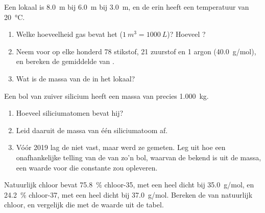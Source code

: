 \begin{exercise}[$\star\star\star$]\label{exo:g10:the-mole:13}
Een lokaal is \qty{8.0}{m} bij \qty{6.0}{m} bij \qty{3.0}{m}, en de
 erin heeft een temperatuur van \qty{20}{\celsius}.
\begin{enumerate}
  \item Welke hoeveelheid gas bevat het ($\qty{1}{m^3} =
        \qty{1000}{L}$)? Hoeveel ?
  \item Neem voor  op elke honderd  78  stikstof,
        21 zuurstof en 1 argon (\qty{40.0}{g/mol}), en bereken de
        gemiddelde  van .
  \item Wat is de massa van de  in het lokaal?
\end{enumerate}
\end{exercise}

\begin{exercise}[$\star\star\star$]\label{exo:g10:the-mole:14}
Een bol van zuiver silicium heeft een massa van precies \qty{1.000}{kg}.
\begin{enumerate}
  \item Hoeveel siliciumatomen bevat hij?
  \item Leid daaruit de massa van één siliciumatoom af.
  \item Vóór 2019 lag de  niet vast, maar werd ze
        gemeten. Leg uit hoe een onafhankelijke telling van de 
        van zo'n bol, waarvan de  bekend is uit de massa,
        een waarde voor die constante zou opleveren.
\end{enumerate}
\end{exercise}

\begin{exercise}[$\star\star\star$]\label{exo:g10:the-mole:15}
Natuurlijk chloor bevat \qty{75.8}{\percent}  chloor-35, met een
 heel dicht bij \qty{35.0}{g/mol}, en \qty{24.2}{\percent}
 chloor-37, met een  heel dicht bij
\qty{37.0}{g/mol}. Bereken de  van natuurlijk chloor, en
vergelijk die met de waarde uit de tabel.
\end{exercise}

